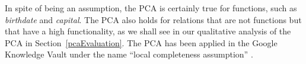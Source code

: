 In spite of being an assumption, the PCA is certainly true for functions, such as \emph{birthdate} and \emph{capital}.
The PCA also holds for relations that are not functions but that have a high functionality,
as we shall see in our qualitative analysis of the PCA in Section~\ref{pcaEvaluation}. 
The PCA has been applied in the Google Knowledge Vault under the name ``local completeness assumption'' \cite{knowledgevault}.









%
